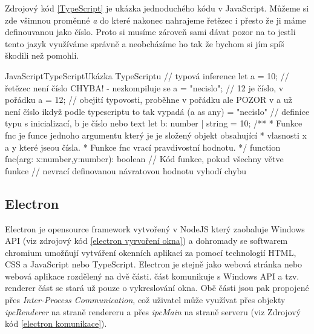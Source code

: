 \documentclass[
  biblatex,
  glossaries,
  index
]{kidiplom}
\begin{document}
Zdrojový kód \ref{TypeScript} je ukázka jednoduchého kódu v JavaScript. Můžeme
si zde všimnou proměnné \textit{a} do které nakonec nahrajeme řetězec i přesto že 
ji máme definouvanou jako číslo. Proto si musíme zároveň sami dávat pozor na to jestli
tento jazyk využíváme správně a neobcházíme ho tak že bychom si jím spíš škodili než pomohli.
\begin{kicode}{JavaScript}{TypeScript}{Ukázka TypeScriptu}
  // typová inference 
  let a = 10;
  // řetězec není číslo CHYBA! - nezkompiluje se
  a = "necislo";
  // 12 je číslo, v pořádku
  a = 12; 
  // obejití typovosti, proběhne v pořádku ale POZOR v a už není číslo ikdyž podle typescriptu to tak vypadá
  (a as any) = "necislo"
  // definice typu s inicializací, b je číslo nebo text
  let b: number | string = 10;
  /**
   * Funkce fnc je funce jednoho argumentu který je je složený objekt obsahující
   * vlasnosti x a y které jseou čísla.
   * Funkce fnc vrací pravdivostní hodnotu.
   */
  function fnc(arg: {x:number,y:number}): boolean {
      // Kód funkce, pokud všechny větve funkce 
      // nevrací definovanou návratovou hodnotu vyhodí chybu
  }

\end{kicode}

\subsection{Electron}
Electron je opensource framework vytvořený v NodeJS který 
zaobaluje Windows API (viz zdrojový kód \ref{electron vyrvoření okna}) a dohromady se softwarem chromium umožňují 
vytváření okenních aplikací za pomocí technologií HTML, CSS a JavaScript nebo TypeScript.
Electron je stejně jako webová stránka nebo webová aplikace rozdělený
na dvě části.  část komunikuje s Windows API a 
 tzv. renderer část se stará už pouze o vykreslování 
okna. Obě části jsou pak propojené přes \textit{Inter-Process Communication}, 
což uživatel může využívat přes objekty \textit{ipcRenderer} na straně rendereru
a přes \textit{ipcMain} na straně serveru (viz Zdrojový kód \ref{electron komunikace}).

\end{document}
